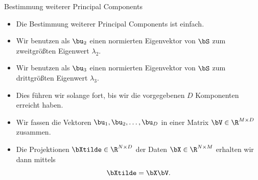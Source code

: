 \begin{frame}{Bestimmung weiterer Principal Components}{}
	\begin{itemize}
		\item Die Bestimmung weiterer Principal Components ist einfach.
		\item Wir benutzen als $\bu_2$ einen normierten Eigenvektor von $\bS$ zum zweitgrößten Eigenwert $\lambda_2$.
		\item Wir benutzen als $\bu_3$ einen normierten Eigenvektor von $\bS$ zum drittgrößten Eigenwert $\lambda_3$.
		\item Dies führen wir solange fort, bis wir die vorgegebenen $D$ Komponenten erreicht haben.
		\item Wir fassen die Vektoren $\bu_1, \bu_2, \ldots, \bu_D$ in einer Matrix $\bV \in \R^{M \times D}$ zusammen.
		\item Die Projektionen $\bXtilde \in \R^{N \times D}$ der Daten $\bX \in \R^{N \times M}$ erhalten wir dann mittels
		\begin{equation}
			\bXtilde = \bX \bV.
		\end{equation}
	\end{itemize}
\end{frame}


